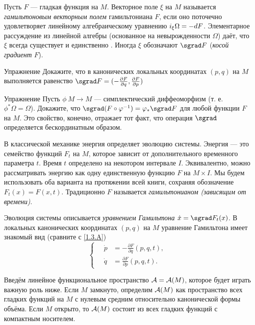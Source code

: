 Пусть $F$ — гладкая функция на $M$.
Векторное поле $\xi$ на $M$ называется \emph{гамильтоновым векторным полем} гамильтониана $F$, если оно поточечно удовлетворяет линейному алгебраическому уравнению $i_\xi \Omega \z= -dF$.
Элементарное рассуждение из линейной алгебры (основанное на невырожденности $\Omega$) даёт, что $\xi$ всегда существует и единственно \cite{MS}.
Иногда $\xi$ обозначают $\sgrad F$ (\emph{косой градиент} $F$).

\begin{ex}{Упражнение}\label{1.3.A}
Докажите, что в канонических локальных координатах $(p, q)$ на
$M$ выполняется равенство \index[symb]{$\sgrad$} $\sgrad F = (-\tfrac{\partial F}{\partial q},\tfrac{\partial F}{\partial p})$
\end{ex}

\begin{ex}{Упражнение}\label{1.3.B}
Пусть  $\phi\: M \to M$ — симплектический диффеоморфизм
(т. е. $\phi^\ast \Omega = \Omega$).
Докажите, что $\sgrad (F \circ \phi^{-1}) \z= \phi_\ast \sgrad F$ для любой функции $F$ на $M$.
Это свойство, конечно, отражает тот факт, что операция $\sgrad$ определяется бескординатным образом.
\end{ex}


В классической механике энергия определяет эволюцию системы.
Энергия — это семейство функций $F_t$ на $M$, которое зависит от
дополнительного временного параметра $t$.
Время $t$ определено на некотором интервале $I$.
Эквивалентно, можно рассматривать энергию как одну единственную функцию $F$ на $M \times I$.
Мы будем использовать оба варианта на протяжении всей книги, сохраняя обозначение $F_t (x) = F (x, t)$.
Традиционно $F$ называется \emph{гамильтонианом (зависящим от времени)}.

Эволюция системы описывается \emph{уравнением Гамильтона} $\dot x \z= \sgrad F_t (x)$.
В локальных канонических координатах $(p, q)$ на $M$ уравнение
Гамильтона имеет знакомый вид (сравните с \ref{1.3.A})
\[
\begin{cases}
\quad\dot p &= - \tfrac{\partial F}{\partial q} (p, q, t),\\
\quad\dot q &= \tfrac{\partial F}{\partial p} (p, q, t).
\end{cases}
\]

Введём линейное функциональное пространство \index[symb]{$\A$}$\mathcal{A}=\mathcal{A}(M)$, которое будет играть важную роль ниже.
Если $M$ замкнуто, определим $\mathcal{A}(M)$ как пространство всех гладких функций на $M$ с нулевым средним относительно канонической формы объёма.
Если $M$ открыто, то $\mathcal{A}(M)$ состоит из всех гладких функций с компактным носителем.

